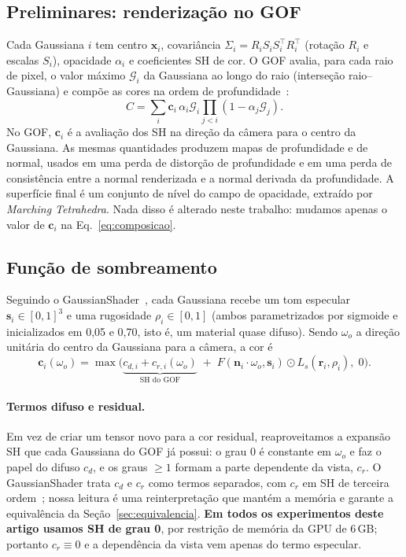 \documentclass[12pt]{article}
\newcommand{\bn}{\mathbf{n}}
\newcommand{\br}{\mathbf{r}}
\newcommand{\bs}{\mathbf{s}}
\newcommand{\bc}{\mathbf{c}}
\begin{document}
\subsection{Preliminares: renderização no GOF}
Cada Gaussiana $i$ tem centro $\mathbf{x}_i$, covariância $\Sigma_i=R_iS_iS_i^\top R_i^\top$ (rotação $R_i$ e escalas $S_i$), opacidade $\alpha_i$ e coeficientes SH de cor.
O GOF avalia, para cada raio de pixel, o valor máximo $\mathcal{G}_i$ da Gaussiana ao longo do raio (interseção raio--Gaussiana) e compõe as cores na ordem de profundidade~\cite{yu2024gof}:
\begin{equation}
C=\sum_{i} \bc_i\,\alpha_i\mathcal{G}_i\prod_{j<i}\left(1-\alpha_j\mathcal{G}_j\right).
\label{eq:composicao}
\end{equation}
No GOF, $\bc_i$ é a avaliação dos SH na direção da câmera para o centro da Gaussiana.
As mesmas quantidades produzem mapas de profundidade e de normal, usados em uma perda de distorção de profundidade e em uma perda de consistência entre a normal renderizada e a normal derivada da profundidade.
A superfície final é um conjunto de nível do campo de opacidade, extraído por \emph{Marching Tetrahedra}.
Nada disso é alterado neste trabalho: mudamos apenas o valor de $\bc_i$ na Eq.~\ref{eq:composicao}.

\subsection{Função de sombreamento}
Seguindo o GaussianShader~\cite{jiang2024gaussianshader}, cada Gaussiana recebe um tom especular $\bs_i\in[0,1]^3$ e uma rugosidade $\rho_i\in[0,1]$ (ambos parametrizados por sigmoide e inicializados em 0,05 e 0,70, isto é, um material quase difuso).
Sendo $\omega_o$ a direção unitária do centro da Gaussiana para a câmera, a cor é
\begin{equation}
\bc_i(\omega_o)=\max\!\Big(\underbrace{c_{d,i}+c_{r,i}(\omega_o)}_{\text{SH do GOF}}\;+\;F(\bn_i\!\cdot\!\omega_o,\bs_i)\odot L_s(\br_i,\rho_i),\;0\Big).
\label{eq:sombreamento}
\end{equation}

\paragraph{Termos difuso e residual.}
Em vez de criar um tensor novo para a cor residual, reaproveitamos a expansão SH que cada Gaussiana do GOF já possui: o grau 0 é constante em $\omega_o$ e faz o papel do difuso $c_d$, e os graus $\geq 1$ formam a parte dependente da vista, $c_r$.
O GaussianShader trata $c_d$ e $c_r$ como termos separados, com $c_r$ em SH de terceira ordem~\cite{jiang2024gaussianshader}; nossa leitura é uma reinterpretação que mantém a memória e garante a equivalência da Seção~\ref{sec:equivalencia}.
\textbf{Em todos os experimentos deste artigo usamos SH de grau 0}, por restrição de memória da GPU de 6\,GB; portanto $c_r\equiv 0$ e a dependência da vista vem apenas do termo especular.
\end{document}
